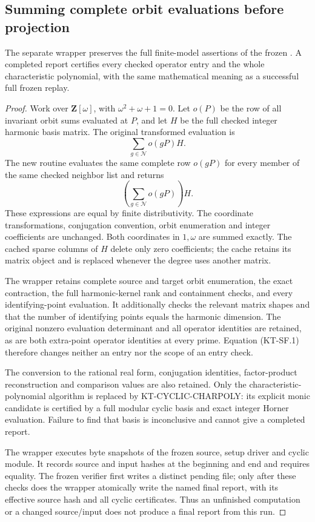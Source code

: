 \subsection{Summing complete orbit evaluations before projection}
\label{sec:kt-sum-first-replay}

\begin{proposition}
The separate wrapper 
preserves the full finite-model assertions of the frozen
.  A completed report
certifies every checked operator entry and the whole
characteristic polynomial, with the same mathematical
meaning as a successful full frozen replay.
\end{proposition}
\begin{proof}
Work over $\mathbf Z[\omega]$, with $\omega^2+\omega+1=0$.
Let $o(P)$ be the row of all invariant orbit sums evaluated
at $P$, and let $H$ be the full checked integer harmonic
basis matrix.  The original transformed evaluation is
\[
                    \sum_{g\in\mathcal N} o(gP)H.
\]
The new routine evaluates the same complete row $o(gP)$
for every member of the same checked neighbor list and
returns
\[
                    \left(\sum_{g\in\mathcal N}o(gP)\right)H.
                                                               \tag{KT-SF.1}
\]
These expressions are equal by finite distributivity.
The coordinate transformations, conjugation convention,
orbit enumeration and integer coefficients are unchanged.
Both coordinates in $1,\omega$ are summed exactly.  The
cached sparse columns of $H$ delete only zero coefficients;
the cache retains its matrix object and is replaced whenever
the degree uses another matrix.

The wrapper retains complete source and target orbit
enumeration, the exact contraction, the full harmonic-kernel
rank and containment checks, and every identifying-point
evaluation.  It additionally checks the relevant matrix
shapes and that the number of identifying points equals
the harmonic dimension.  The original nonzero evaluation
determinant and all operator identities are retained, as
are both extra-point operator identities at every prime.
Equation (KT-SF.1) therefore changes neither an entry nor
the scope of an entry check.

The conversion to the rational real form, conjugation
identities, factor-product reconstruction and comparison
values are also retained.  Only the characteristic-polynomial
algorithm is replaced by KT-CYCLIC-CHARPOLY: its explicit
monic candidate is certified by a full modular cyclic basis
and exact integer Horner evaluation.  Failure to find that
basis is inconclusive and cannot give a completed report.

The wrapper executes byte snapshots of the frozen source,
setup driver and cyclic module.  It records source and input
hashes at the beginning and end and requires equality.
The frozen verifier first writes a distinct pending file;
only after these checks does the wrapper atomically write
the named final report, with its effective source hash and
all cyclic certificates.  Thus an unfinished computation
or a changed source/input does not produce a final report
from this run.
\end{proof}


